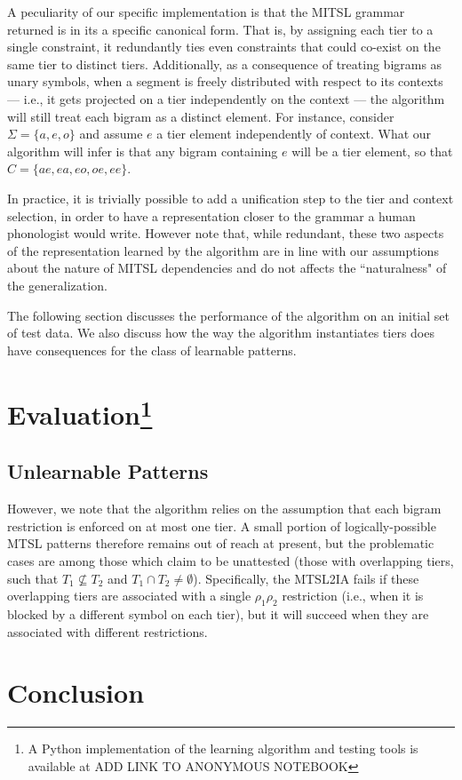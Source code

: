 \documentclass[11pt,a4paper]{article}
\begin{document}
A peculiarity of our specific implementation is that the MITSL grammar returned is in its a specific canonical form.
That is, by assigning each tier to a single constraint,  it redundantly ties even  constraints that could co-exist on the same tier to distinct tiers.
Additionally, as a consequence of treating bigrams as unary symbols,  when a segment is freely distributed with respect to its contexts --- i.e., it gets projected on a tier independently on the context --- the algorithm will still treat each bigram as a distinct element.
For instance, consider $\Sigma =\{ a, e, o \}$ and assume  $e$ a tier element independently of context.
What our algorithm will infer is that any bigram containing $e$ will be a tier element, so that $C = \{ ae, ea, eo, oe, ee\}$.

In practice, it is trivially possible to add a unification step to the tier and context selection, in order to have a representation closer to the grammar a human phonologist would write.
However note that, while redundant, these two aspects of the representation learned by the algorithm are in line with our assumptions about the nature of MITSL dependencies and do not affects the ``naturalness" of the generalization.

The following section discusses the performance of the algorithm on an initial set of test data.
We also discuss how the way the algorithm instantiates tiers does have consequences for the class of learnable patterns.


\section{Evaluation\footnote{A Python implementation of the learning algorithm and testing tools is available at ADD LINK TO ANONYMOUS NOTEBOOK}}


\subsection{Unlearnable Patterns}
\label{ssec:limits}

However, we note that the algorithm relies on the assumption that each bigram restriction is enforced on at most one tier. A small portion of logically-possible MTSL patterns therefore remains out of reach at present, but the problematic cases are among those which \citet{AksenovaDeshmukh2018} claim to be unattested (those with overlapping tiers, such that $T_1\not\subseteq T_2$ and $T_1\cap T_2\neq\emptyset$). Specifically, the MTSL2IA fails if these overlapping tiers are associated with a single \text{*}$\rho_1\rho_2$ restriction (i.e., when it is blocked by a different symbol on each tier), but it will succeed when they are associated with different restrictions.

\section{Conclusion}




\end{document}
